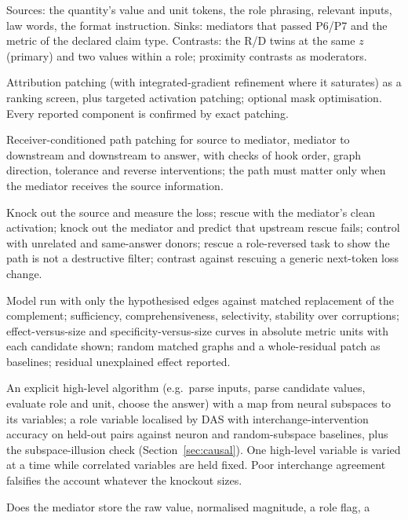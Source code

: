 \documentclass[10pt,a4paper]{article}
\begin{document}
\begin{description}[leftmargin=1.2em,style=nextline]
\item[P8.1 Sources and sinks declared first.] Sources: the quantity's value and unit tokens, the role phrasing,
relevant inputs, law words, the format instruction. Sinks: mediators that passed P6/P7 and the metric of the
declared claim type. Contrasts: the R/D twins at the same $z$ (primary) and two values within a role; proximity
contrasts as moderators.
\item[P8.2 Two discovery procedures.] Attribution patching (with integrated-gradient refinement where it saturates)
as a ranking screen, plus targeted activation patching; optional mask optimisation. Every reported component is
confirmed by exact patching.
\item[P8.3 Path patching.] Receiver-conditioned path patching for source to mediator, mediator to downstream and
downstream to answer, with checks of hook order, graph direction, tolerance and reverse interventions; the path must
matter only when the mediator receives the source information.
\item[P8.4 Knockout--rescue ordering.] Knock out the source and measure the loss; rescue with the mediator's clean
activation; knock out the mediator and predict that upstream rescue fails; control with unrelated and same-answer
donors; rescue a role-reversed task to show the path is not a destructive filter; contrast against rescuing a
generic next-token loss change.
\item[P8.5 Completeness and minimality.] Model run with only the hypothesised edges against matched replacement of
the complement; sufficiency, comprehensiveness, selectivity, stability over corruptions; effect-versus-size and
specificity-versus-size curves in absolute metric units with each candidate shown; random matched graphs and a
whole-residual patch as baselines; residual unexplained effect reported.
\item[P8.6 Causal abstraction.] An explicit high-level algorithm (e.g.\ parse inputs, parse candidate values,
evaluate role and unit, choose the answer) with a map from neural subspaces to its variables; a role variable
localised by DAS with interchange-intervention accuracy on held-out pairs against neuron and random-subspace
baselines, plus the subspace-illusion check (Section~\ref{sec:causal}). One high-level variable is varied at a
time while correlated variables are held fixed. Poor interchange agreement falsifies the
account whatever the knockout sizes.
\item[P8.7 Bottleneck hypotheses.] Does the mediator store the raw value, normalised magnitude, a role flag, a

\end{description}
\end{document}
